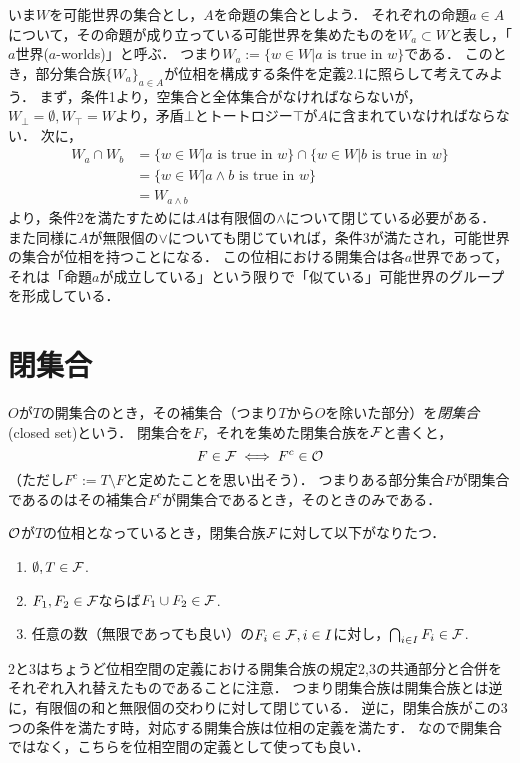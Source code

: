 \documentclass[11pt,a4paper]{jsarticle}
\begin{document}
\begin{example}
\label{possibleworlds}
いま$W$を可能世界の集合とし，$A$を命題の集合としよう．
それぞれの命題$a \in A$について，その命題が成り立っている可能世界を集めたものを$W_a \subset W$と表し，「$a$世界($a$-worlds)」と呼ぶ．
つまり$W_a := \{ w \in W | a \text{ is true in } w \}$である．
このとき，部分集合族$\{ W_a \}_{a \in A}$が位相を構成する条件を定義2.1に照らして考えてみよう．
まず，条件1より，空集合と全体集合がなければならないが，$W_{\bot} = \emptyset, W_{\top}=W$より，矛盾$\bot$とトートロジー$\top$が$A$に含まれていなければならない．
次に，
\begin{align*}
W_a \cap W_b &=  \{ w \in W | a \text{ is true in } w \} \cap \{ w \in W | b \text{ is true in } w \} \\
&= \{ w \in W | a \wedge b \text{ is true in } w \} \\
&= W_{a \wedge b}
\end{align*}
より，条件2を満たすためには$A$は有限個の$\wedge$について閉じている必要がある．
また同様に$A$が無限個の$\vee$についても閉じていれば，条件3が満たされ，可能世界の集合が位相を持つことになる．
この位相における開集合は各$a$世界であって，それは「命題$a$が成立している」という限りで「似ている」可能世界のグループを形成している．
\end{example}


\section{閉集合}
$O$が$T$の開集合のとき，その補集合（つまり$T$から$O$を除いた部分）を\emph{閉集合}(closed set)という．
閉集合を$F$，それを集めた閉集合族を$\mathcal{F}$と書くと，
\[
 F \in \mathcal{F} \iff F^c \in \mathcal{O}
\]
（ただし$F^c := T \setminus F$と定めたことを思い出そう）．
つまりある部分集合$F$が閉集合であるのはその補集合$F^c$が開集合であるとき，そのときのみである．

$\mathcal{O}$が$T$の位相となっているとき，閉集合族$\mathcal{F}$に対して以下がなりたつ．
\begin{enumerate}
 \item $\emptyset, T \in \mathcal{F}$.
 \item $F_1, F_2 \in \mathcal{F}$ならば$F_1 \cup F_2 \in \mathcal{F}$.
 \item 任意の数（無限であっても良い）の$F_i \in \mathcal{F}, i \in I$に対し，$\bigcap_{i \in I} F_i \in \mathcal{F}$.
\end{enumerate}
2と3はちょうど位相空間の定義における開集合族の規定2,3の共通部分と合併をそれぞれ入れ替えたものであることに注意．
つまり閉集合族は開集合族とは逆に，有限個の和と無限個の交わりに対して閉じている．
逆に，閉集合族がこの3つの条件を満たす時，対応する開集合族は位相の定義を満たす．
なので開集合ではなく，こちらを位相空間の定義として使っても良い．
\end{document}
